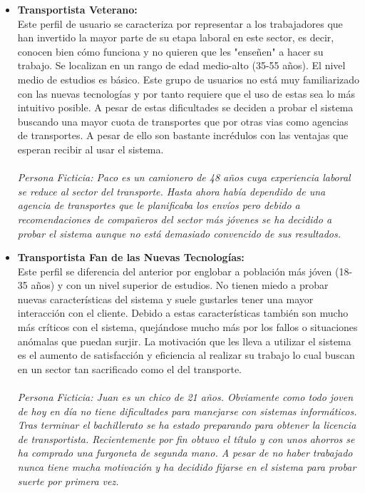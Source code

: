 \documentclass[10pt, a4paper,spanish]{article}
\begin{document}
		\begin{itemize}
			\item \textbf{Transportista Veterano:} \\
				Este perfil de usuario se caracteriza por representar a los trabajadores que han invertido la mayor parte de su etapa laboral en este sector, es decir, conocen bien cómo funciona y no quieren que les "enseñen" a hacer su trabajo. Se localizan en un rango de edad medio-alto (35-55 años). El nivel medio de estudios es básico. Este grupo de usuarios no está muy familiarizado con las nuevas tecnologías y por tanto requiere que el uso de estas sea lo más intuitivo posible. A pesar de estas dificultades se deciden a probar el sistema buscando una mayor cuota de transportes que por otras vias como agencias de transportes. A pesar de ello son bastante incrédulos con las ventajas que esperan recibir al usar el sistema. \\ \\
				\textit{Persona Ficticia: Paco es un camionero de 48 años cuya experiencia laboral se reduce al sector del transporte. Hasta ahora había dependido de una agencia de transportes que le planificaba los envíos pero debido a recomendaciones de compañeros del sector más jóvenes se ha decidido a probar el sistema aunque no está demasiado convencido de sus resultados.}

			\item \textbf{Transportista Fan de las Nuevas Tecnologías:} \\
				Este perfil se diferencia del anterior por englobar a población más jóven (18-35 años) y con un nivel superior de estudios. No tienen miedo a probar nuevas características del sistema y suele gustarles tener una mayor interacción con el cliente. Debido a estas características también son mucho más críticos con el sistema, quejándose mucho más por los fallos o situaciones anómalas que puedan surjir. La motivación que les lleva a utilizar el sistema es el aumento de satisfacción y eficiencia al realizar su trabajo lo cual buscan en un sector tan sacrificado como el del transporte. \\ \\
				\textit{Persona Ficticia: Juan es un chico de 21 años. Obviamente como todo joven de hoy en día no tiene dificultades para manejarse con sistemas informáticos. Tras terminar el bachillerato se ha estado preparando para obtener la licencia de transportista. Recientemente por fin obtuvo el título y con unos ahorros se ha comprado una furgoneta de segunda mano. A pesar de no haber trabajado nunca tiene mucha motivación y ha decidido fijarse en el sistema para probar suerte por primera vez.}


\end{itemize}
\end{document}
